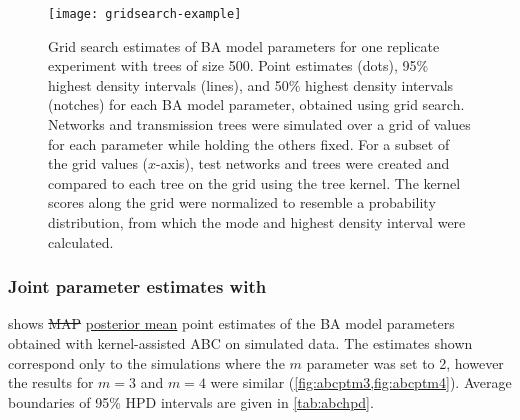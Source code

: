 \begin{figure}[ht]
  \centering
  \texttt{[image: gridsearch-example]}
  \caption[
    Grid search estimates of \gls{BA} model parameters for one replicate
    experiment with trees of size 500.
  ]{
    Grid search estimates of \gls{BA} model parameters for one replicate
    experiment with trees of size 500. Point estimates (dots), 95\% highest
    density intervals (lines), and 50\% highest density intervals (notches) for
    each \gls{BA} model parameter, obtained using grid search. Networks and
    transmission trees were simulated over a grid of values for each parameter
    while holding the others fixed. For a subset of the grid values ($x$-axis),
    test networks and trees were created and compared to each tree on the grid
    using the tree kernel. The kernel scores along the grid were normalized to
    resemble a probability distribution, from which the mode and highest
    density interval were calculated. 
  } 
  \label{fig:gridest}
\end{figure}

\subsubsection*{Joint parameter estimates with }



 shows {\color{red}\sout{\gls{MAP}}}
{\color{blue}\uline{posterior mean}} point estimates of the BA model parameters
obtained with kernel-assisted ABC on simulated data. The estimates shown
correspond only to the simulations where the $m$ parameter was set to 2,
however the results for $m = 3$ and $m = 4$ were similar
(\cref{fig:abcptm3,fig:abcptm4}). Average boundaries of 95\% \gls{HPD}
intervals are given in \cref{tab:abchpd}.

